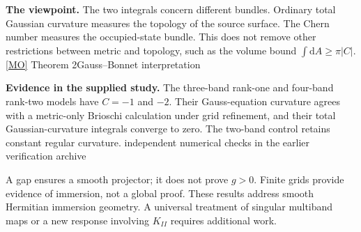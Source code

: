 \documentclass[11pt,a4paper]{article}
\newcommand{\Gr}{\operatorname{Gr}}
\newcommand{\dd}{\mathrm d}
\newcommand{\srctext}[2]{\textcolor{KnownBlue}{\scriptsize\sffamily\hyperlink{ref:#1}{[#1]} #2}}
\newcommand{\src}[2]{\ifmmode\text{\srctext{#1}{#2}}\else\srctext{#1}{#2}\fi}
\newcommand{\esrctext}[1]{\textcolor{ProposalGreen}{\scriptsize\sffamily [E] #1}}
\newcommand{\esrc}[1]{\ifmmode\text{\esrctext{#1}}\else\esrctext{#1}\fi}
\begin{document}
\begin{center}
\end{center}
\textbf{The viewpoint.} The two integrals concern different bundles.
Ordinary total Gaussian curvature measures the topology of the source
surface. The Chern number measures the occupied-state bundle.
This does not remove other restrictions between metric and topology, such as
the volume bound $\int\dd A\ge\pi|C|$.
\src{MO}{Theorem 2}\quad\esrc{Gauss--Bonnet interpretation}

\textbf{Evidence in the supplied study.}
The three-band rank-one and four-band rank-two models have $C=-1$ and $-2$.
Their Gauss-equation curvature agrees with a metric-only Brioschi calculation
under grid refinement, and their total Gaussian-curvature integrals converge
to zero. The two-band control retains constant regular curvature.
\esrc{independent numerical checks in the earlier verification archive}
\begin{cautionbox}
A gap ensures a smooth projector; it does not prove $g>0$.
Finite grids provide evidence of immersion, not a global proof.
These results address smooth Hermitian immersion geometry.
A universal treatment of singular multiband maps or a new response involving
$K_{II}$ requires additional work.
\end{cautionbox}
\end{document}

